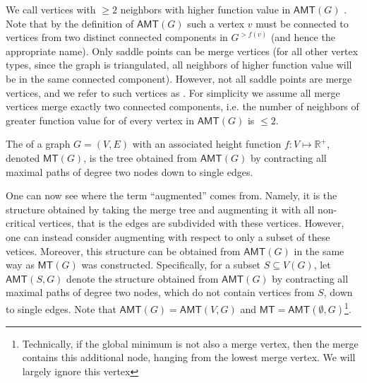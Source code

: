 \documentclass[A4paper,11pt]{article}
\newcommand{\RR}{\mathbb{R}}
\newcommand{\AMT}{\ensuremath{\mathsf{AMT}}\xspace}
\newcommand{\MT}{\ensuremath{\mathsf{MT}}\xspace}
\begin{document}
We call vertices with $\geq 2$ neighbors with higher function value in $\AMT(G)$ .  Note that by the definition of $\AMT(G)$ such a vertex $v$ must be connected to vertices from two distinct connected components in $G^{>f(v)}$ (and hence the appropriate name).  Only saddle points can be merge vertices (for all other vertex types, since the graph is triangulated, all neighbors of higher function value will be in the same connected component).  However, not all saddle points are merge vertices, and we refer to such vertices as .  For simplicity we assume all merge vertices merge exactly two connected components, i.e. the number of neighbors of greater function value for of every vertex in $\AMT(G)$ is $\leq 2$.

\begin{definition}
The  of a graph $G=(V,E)$ with an associated height function $f:V \mapsto \RR^+$, denoted $\MT(G)$, is the tree obtained from $\AMT(G)$ by contracting all maximal paths of degree two nodes down to single edges.
\end{definition}

One can now see where the term ``augmented'' comes from.  Namely, it is the structure obtained by taking the merge tree and augmenting it with all non-critical vertices, that is the edges are subdivided with these vertices.  However, one can instead consider augmenting with respect to only a subset of these vetices.  Moreover, this structure can be obtained from $\AMT(G)$ in the same way as $\MT(G)$ was constructed. Specifically, for a subset $S\subseteq V(G)$, let $\AMT(S, G)$ denote the structure obtained from $\AMT(G)$ by contracting all maximal paths of degree two nodes, which do not contain vertices from $S$, down to single edges. Note that $\AMT(G) = \AMT(V,G)$ and $\MT=\AMT(\emptyset, G)$\footnote{Technically, if the global minimum is not also a merge vertex, then the merge contains this additional node, hanging from the lowest merge vertex.  We will largely ignore this vertex}.
\end{document}

